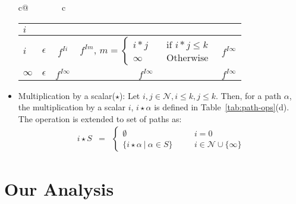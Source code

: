 \documentclass[letterpaper]{sig-alternate}
\newcommand{\indrct}{\ensuremath{I}}
\newcommand{\nat}{\ensuremath{\mathcal{N}}}
\begin{document}
\begin{itemize}
\begin{table*}[t]
\begin{center}
{\begin{tabular}{c@{$\qquad\qquad$}c}
{\begin{tabular*}{0.75\textwidth}{@{\extracolsep{\fill}} l@{\ }|cccc }
  $i$ &&&& \\ \hline 
  $i$      & $\epsilon$ & ${f^{\indrct i}}$ & $f^{\indrct
    m}$, $m = \left\{\begin{array}{lcl}
  i*j    && \mbox { if } i*j \leq k \\
  \infty && \mbox{ Otherwise} 
  \end{array}\right.$
  & ${f^{\indrct \infty}}$ \\ 
  $\infty$ & $\epsilon$ &${f^{\indrct \infty}}$ &
  ${f^{\indrct \infty}}$& ${f^{\indrct \infty}}$\\ \hline 
\end{tabular*}}
\end{tabular}}
\end{center}
\end{table*}

\item Multiplication by a scalar($\star$): Let $i, j
  \in \nat, i \leq k, j \leq k$. Then, for a path $\alpha$,
  the multiplication by a scalar $i$, $i\star\alpha$ is
  defined in Table~\ref{tab:path-ops}(d). The operation is
  extended to set of paths as:
\begin{eqnarray*}
  i \star {S} &=&   \left\{ \begin{array}{lcl}
    \emptyset &\quad& i = 0 \\
    \{ i\star \alpha \ \vert\ \alpha \in S\} &\quad& i\in \nat \cup \{\infty\} 
  \end{array} \right.
\end{eqnarray*}

\end{itemize}

\section{Our Analysis}\label{sec:Analysis_Rules}
\end{document}
